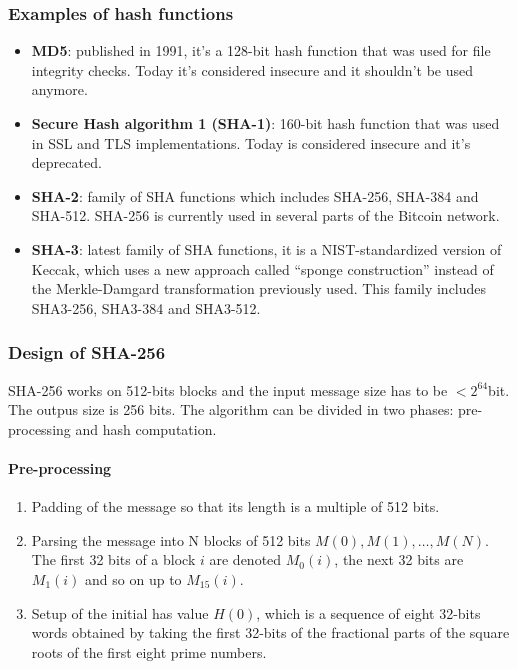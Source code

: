 \subsubsection{Examples of hash functions}
\begin{itemize}
  \item \textbf{MD5}: published in 1991, it's a 128-bit hash function that was
  used for file integrity checks. Today it's considered insecure and it shouldn't
  be used anymore.
  \item \textbf{Secure Hash algorithm 1 (SHA-1)}: 160-bit hash function that was
  used in SSL and TLS implementations. Today is considered insecure and it's
  deprecated.
  \item \textbf{SHA-2}: family of SHA functions which includes SHA-256, SHA-384
  and SHA-512. SHA-256 is currently used in several parts of the Bitcoin network.
  \item \textbf{SHA-3}: latest family of SHA functions, it is a NIST-standardized
  version of Keccak, which uses a new approach called ``sponge construction''
  instead of the Merkle-Damgard transformation previously used. This family
  includes SHA3-256, SHA3-384 and SHA3-512.
\end{itemize}












\subsubsection{Design of SHA-256} SHA-256 works on 512-bits blocks and the input
message size has to be $< 2^{64}$bit. The outpus size is 256 bits. The algorithm
can be divided in two phases: pre-processing and hash computation.

\paragraph{Pre-processing}
\begin{enumerate}
  \item Padding of the message so that its length is a multiple of 512 bits.
  \item Parsing the message into N blocks of 512 bits $M(0), M(1), \dots, M(N)$.
  The first 32 bits of a block $i$ are denoted $M_0(i)$, the next 32 bits
  are $M_1(i)$ and so on up to $M_{15}(i)$.
  \item Setup of the initial has value $H(0)$, which is a sequence of eight 32-bits
  words obtained by taking the first 32-bits of the fractional parts of the
  square roots of the first eight prime numbers.
\end{enumerate}


